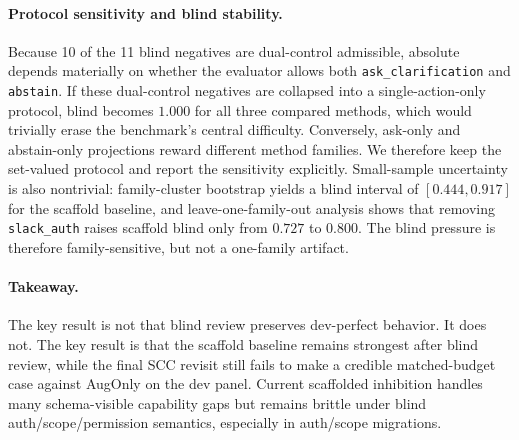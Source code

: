 \paragraph{Protocol sensitivity and blind stability.}
Because 10 of the 11 blind negatives are dual-control admissible, absolute \NOS{} depends materially on whether the evaluator allows both \texttt{ask\_clarification} and \texttt{abstain}. If these dual-control negatives are collapsed into a single-action-only protocol, blind \NOS{} becomes $1.000$ for all three compared methods, which would trivially erase the benchmark's central difficulty. Conversely, ask-only and abstain-only projections reward different method families. We therefore keep the set-valued protocol and report the sensitivity explicitly. Small-sample uncertainty is also nontrivial: family-cluster bootstrap yields a blind \NOS{} interval of $[0.444, 0.917]$ for the scaffold baseline, and leave-one-family-out analysis shows that removing \texttt{slack\_auth} raises scaffold blind \NOS{} only from $0.727$ to $0.800$. The blind pressure is therefore family-sensitive, but not a one-family artifact.

\paragraph{Takeaway.}
The key result is not that blind review preserves dev-perfect behavior. It does not. The key result is that the scaffold baseline remains strongest after blind review, while the final SCC revisit still fails to make a credible matched-budget case against AugOnly on the dev panel. Current scaffolded inhibition handles many schema-visible capability gaps but remains brittle under blind auth/scope/permission semantics, especially in auth/scope migrations.

